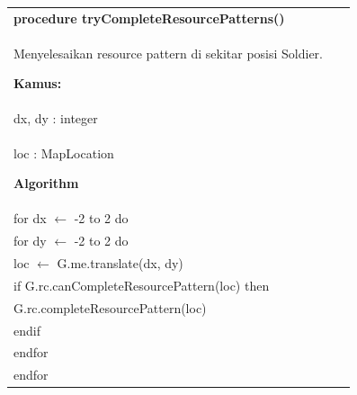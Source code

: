 \documentclass{article}
\newenvironment{pseudobox}
{
\centering
\begin{longtable}{|p{0.94\linewidth}|}
\hline
}
{
\\ \hline
\end{longtable}
\vspace{0.05cm}
}
\begin{document}
\begin{pseudobox}
\textbf{procedure tryCompleteResourcePatterns()} \\
{ Menyelesaikan resource pattern di sekitar posisi Soldier. }

\textbf{Kamus:} \\
\hspace*{1em} dx, dy : integer \\
\hspace*{1em} loc : MapLocation

\textbf{Algorithm} \\
\hspace*{1em} for dx $\leftarrow$ -2 to 2 do \\
\hspace*{2em} for dy $\leftarrow$ -2 to 2 do \\
\hspace*{3em} loc $\leftarrow$ G.me.translate(dx, dy) \\
\hspace*{3em} if G.rc.canCompleteResourcePattern(loc) then \\
\hspace*{4em} G.rc.completeResourcePattern(loc) \\
\hspace*{3em} endif \\
\hspace*{2em} endfor \\
\hspace*{1em} endfor
\end{pseudobox}
\end{document}
